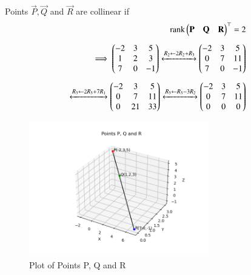 \documentclass[journal]{IEEEtran}
\begin{document}
Points $\vec{P},\vec{Q}$ and $\vec{R}$ are collinear if 
\begin{align}
	\text{rank}\begin{pmatrix}\mathbf{P} & \mathbf{Q} & \mathbf{R}\end{pmatrix}^\top = 2\\[5pt]
	\implies \begin{pmatrix}-2 & 3 & 5\\1 & 2 & 3\\7 & 0 & -1\end{pmatrix}\xleftrightarrow[]{R_2 \leftarrow 2R_2 + R_3} \begin{pmatrix}-2 & 3 & 5\\0 & 7 & 11\\7 & 0 & -1\end{pmatrix}\\[5pt]
	\xleftrightarrow[]{R_3 \leftarrow 2R_3 + 7R_1} \begin{pmatrix}-2 & 3 & 5\\0 &7 & 11\\0 & 21 & 33\end{pmatrix} \xleftrightarrow[]{R_3 \leftarrow R_3 - 3R_2} \begin{pmatrix}-2 & 3 & 5\\0 & 7 & 11\\0 & 0 & 0\end{pmatrix}
\end{align}
\newpage
	\begin{figure}[h!]    
	  \begin{center}
		\includegraphics[width=0.7\textwidth]{fig/fig.png}
		\caption{Plot of Points P, Q and R}
		\label{fig:1-1.5-27-Figure-1}
	  \end{center}	
	\end{figure}
\end{document}
